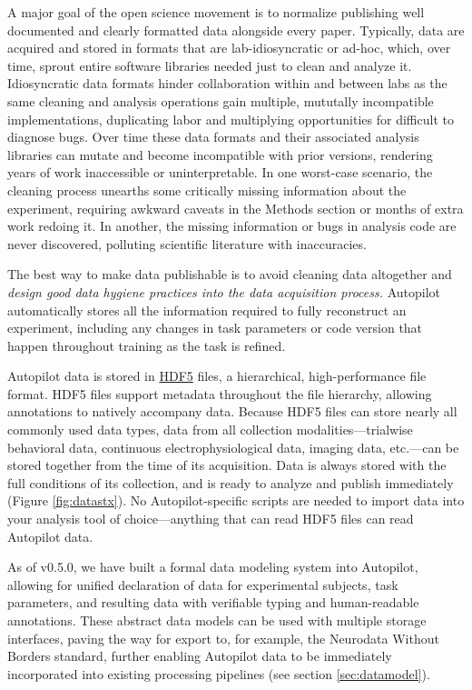 A major goal of the open science movement is to normalize publishing well documented and clearly formatted data alongside every paper. Typically, data are acquired and stored in formats that are lab-idiosyncratic or ad-hoc, which, over time, sprout entire software libraries needed just to clean and analyze it. Idiosyncratic data formats hinder collaboration within and between labs as the same cleaning and analysis operations gain multiple, mututally incompatible implementations, duplicating labor and multiplying opportunities for difficult to diagnose bugs. Over time these data formats and their associated analysis libraries can mutate and become incompatible with prior versions, rendering years of work inaccessible or uninterpretable. In one worst-case scenario, the cleaning process unearths some critically missing information about the experiment, requiring awkward caveats in the Methods section or months of extra work redoing it. In another, the missing information or bugs in analysis code are never discovered, polluting scientific literature with inaccuracies. 

The best way to make data publishable is to avoid cleaning data altogether and \textit{design good data hygiene practices into the data acquisition process.} Autopilot automatically stores all the information required to fully reconstruct an experiment, including any changes in task parameters or code version that happen throughout training as the task is refined.

Autopilot data is stored in \href{https://support.hdfgroup.org/HDF5/whatishdf5.html}{HDF5} files, a hierarchical, high-performance file format. HDF5 files support metadata throughout the file hierarchy, allowing annotations to natively accompany data. Because HDF5 files can store nearly all commonly used data types, data from all collection modalities---trialwise behavioral data, continuous electrophysiological data, imaging data, etc.---can be stored together from the time of its acquisition. Data is always stored with the full conditions of its collection, and is ready to analyze and publish immediately (Figure \ref{fig:datastx}). No Autopilot-specific scripts are needed to import data into your analysis tool of choice---anything that can read HDF5 files can read Autopilot data. 

As of v0.5.0, we have built a formal data modeling system into Autopilot, allowing for unified declaration of data for experimental subjects, task parameters, and resulting data with verifiable typing and human-readable annotations. These abstract data models can be used with multiple storage interfaces, paving the way for export to, for example, the Neurodata Without Borders standard\citep{rubelNWBAccessibleData2019}, further enabling Autopilot data to be immediately incorporated into existing processing pipelines (see section \ref{sec:datamodel}).

